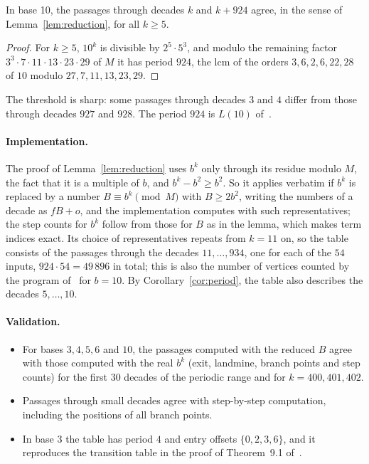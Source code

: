 \begin{corollary}
  \label{cor:period}
  In base 10, the passages through decades $k$ and $k + 924$ agree, in the sense of
  Lemma~\ref{lem:reduction}, for all $k \ge 5$.
\end{corollary}

\begin{proof}
  For $k \ge 5$, $10^k$ is divisible by $2^5 \cdot 5^3$, and modulo the remaining factor
  $3^3 \cdot 7 \cdot 11 \cdot 13 \cdot 23 \cdot 29$ of $M$ it has period $924$, the lcm of the
  orders $3, 6, 2, 6, 22, 28$ of $10$ modulo $27, 7, 11, 13, 23, 29$.
\end{proof}

The threshold is sharp: some passages through decades $3$ and $4$ differ from those through
decades $927$ and $928$. The period $924$ is $L(10)$ of~\cite{dbts}.

\paragraph{Implementation.}
The proof of Lemma~\ref{lem:reduction} uses $b^k$ only through its residue modulo $M$, the fact that
it is a multiple of $b$, and $b^k - b^2 \ge b^2$. So it applies verbatim if $b^k$ is replaced by a
number $B \equiv b^k \pmod M$ with $B \ge 2b^2$, writing the numbers of a decade as $f B + o$, and
the implementation computes with such representatives; the step counts for $b^k$ follow from those
for $B$ as in the lemma, which makes term indices exact. Its choice of representatives repeats from
$k = 11$ on, so the table consists of the passages through the decades $11, \dots, 934$, one for each
of the $54$ inputs, $924 \cdot 54 = 49\,896$ in total; this is also the number of vertices counted by
the program of~\cite{dbtscode} for $b = 10$. By Corollary~\ref{cor:period}, the table also describes
the decades $5, \dots, 10$.

\paragraph{Validation.}
\begin{itemize}
  \item For bases $3, 4, 5, 6$ and $10$, the passages computed with the reduced $B$ agree with those
        computed with the real $b^k$ (exit, landmine, branch points and step counts) for the
        first $30$ decades of the periodic range and for $k = 400, 401, 402$.
  \item Passages through small decades agree with step-by-step computation, including the positions
        of all branch points.
  \item In base 3 the table has period $4$ and entry offsets $\{0, 2, 3, 6\}$, and it reproduces the
        transition table in the proof of Theorem~9.1 of~\cite{comma}.
\end{itemize}
